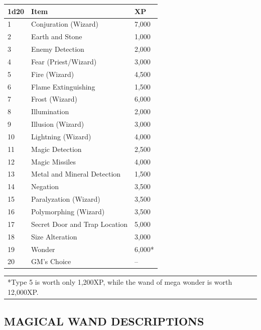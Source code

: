 \begin{multicols}{2}
\begin{minipage}{\columnwidth}
\label{wands}
\noindent
\begin{tabular}{|p{}|p{}|p{}|}
\hline
1d20	& Item	& XP \\
\hline\hline
\rowcolor[gray]{.9}1	& Conjuration (Wizard)	& 7,000 \\
2	& Earth and Stone	& 1,000 \\
\rowcolor[gray]{.9}3	& Enemy Detection	& 2,000 \\
4	& Fear (Priest/Wizard)	& 3,000 \\
\rowcolor[gray]{.9}5	& Fire (Wizard)	& 4,500 \\
6	& Flame Extinguishing	& 1,500 \\
\rowcolor[gray]{.9}7	& Frost (Wizard)	& 6,000 \\
8	& Illumination	& 2,000 \\
\rowcolor[gray]{.9}9	& Illusion (Wizard)	& 3,000 \\
10	& Lightning (Wizard)	& 4,000 \\
\rowcolor[gray]{.9}11	& Magic Detection	& 2,500 \\
12	& Magic Missiles	& 4,000 \\
\rowcolor[gray]{.9}13	& Metal and Mineral Detection	& 1,500 \\
14	& Negation	& 3,500 \\
\rowcolor[gray]{.9}15	& Paralyzation (Wizard)	& 3,500 \\
16	& Polymorphing (Wizard)	& 3,500 \\
\rowcolor[gray]{.9}17	& Secret Door and Trap Location	& 5,000 \\
18	& Size Alteration	& 3,000 \\
\rowcolor[gray]{.9}19	& Wonder	& 6,000* \\
20	& GM's Choice	& -- \\
\hline
\end{tabular}
\noindent\begin{tabular}{p{}}
*Type 5 is worth only 1,200XP, while the wand of mega wonder is worth 12,000XP. \\
\end{tabular}\vspace{.5em}

\end{minipage}

\subsection{MAGICAL WAND DESCRIPTIONS}


\end{multicols}
